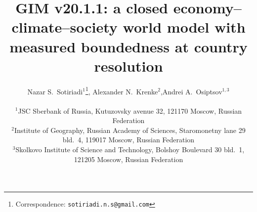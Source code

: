 \documentclass[12pt,a4paper]{article}
\begin{document}
\title{\vspace{-1.5em}\textbf{GIM v20.1.1: a closed economy--climate--society world model
with measured boundedness at country resolution}}

\author{%
Nazar S.~Sotiriadi$^{1}$\thanks{Correspondence: \texttt{sotiriadi.n.s@gmail.com}},\quad
Alexander N.~Krenke$^{2}$,\quad Andrei A.~Osiptsov$^{1,3}$\\[0.6em]
\parbox{0.94\linewidth}{\centering\small
$^{1}$JSC Sberbank of Russia, Kutuzovsky avenue 32, 121170 Moscow, Russian Federation\\
$^{2}$Institute of Geography, Russian Academy of Sciences, Staromonetny lane 29 bld.~4,
119017 Moscow, Russian Federation\\
$^{3}$Skolkovo Institute of Science and Technology, Bolshoy Boulevard 30 bld.~1,
121205 Moscow, Russian Federation}
}
\date{}
\maketitle
\end{document}

